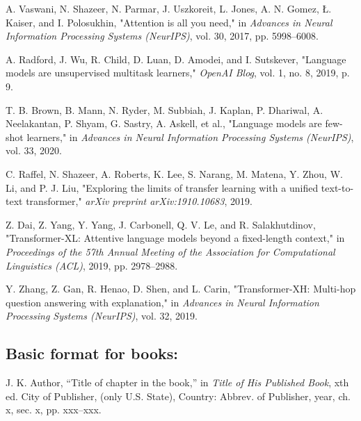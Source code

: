 \documentclass[journal]{IEEEtai}
\begin{document}
\begin{thebibliography}{34}

A. Vaswani, N. Shazeer, N. Parmar, J. Uszkoreit, L. Jones, A. N. Gomez, Ł. Kaiser, and I. Polosukhin, "Attention is all you need," in \emph{Advances in Neural Information Processing Systems (NeurIPS)}, vol. 30, 2017, pp. 5998--6008.

A. Radford, J. Wu, R. Child, D. Luan, D. Amodei, and I. Sutskever, "Language models are unsupervised multitask learners," \emph{OpenAI Blog}, vol. 1, no. 8, 2019, p. 9.

T. B. Brown, B. Mann, N. Ryder, M. Subbiah, J. Kaplan, P. Dhariwal, A. Neelakantan, P. Shyam, G. Sastry, A. Askell, et al., "Language models are few-shot learners," in \emph{Advances in Neural Information Processing Systems (NeurIPS)}, vol. 33, 2020.

C. Raffel, N. Shazeer, A. Roberts, K. Lee, S. Narang, M. Matena, Y. Zhou, W. Li, and P. J. Liu, "Exploring the limits of transfer learning with a unified text-to-text transformer," \emph{arXiv preprint arXiv:1910.10683}, 2019.

Z. Dai, Z. Yang, Y. Yang, J. Carbonell, Q. V. Le, and R. Salakhutdinov, "Transformer-XL: Attentive language models beyond a fixed-length context," in \emph{Proceedings of the 57th Annual Meeting of the Association for Computational Linguistics (ACL)}, 2019, pp. 2978--2988.

Y. Zhang, Z. Gan, R. Henao, D. Shen, and L. Carin, "Transformer-XH: Multi-hop question answering with explanation," in \emph{Advances in Neural Information Processing Systems (NeurIPS)}, vol. 32, 2019.

\end{thebibliography}

\subsection*{Basic format for books:}\vspace*{-12pt}
\def\refname{}
\begin{thebibliography}{34}
\item[] J. K. Author, ``Title of chapter in the book,'' in {\em Title of His Published Book}, xth ed. City of Publisher, (only U.S. State), Country: Abbrev. of Publisher, year, ch. x, sec. x, pp. xxx--xxx.
\end{thebibliography}
\end{document}
